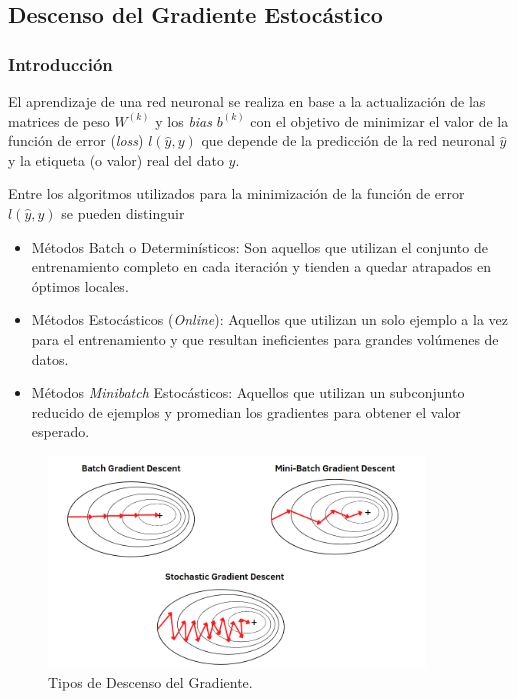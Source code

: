 \subsection{Descenso del Gradiente Estocástico} 

\subsubsection{Introducción }

El aprendizaje de una red neuronal se realiza en base a la actualización de las matrices de peso $W^{(k)}$ y los \textit{bias} $b^{(k)}$ con el objetivo de minimizar el valor de la función de error (\textit{loss}) $l(\hat{y},y)$ que depende de la predicción de la red neuronal $\hat{y}$ y la etiqueta (o valor) real del dato $y$. 

\vspace{0.2cm}

Entre los algoritmos utilizados para la minimización de la función de error $l(\hat{y},y)$ se pueden distinguir 
\begin{itemize}
    \item Métodos Batch o Determinísticos: Son aquellos que utilizan el conjunto de entrenamiento completo en cada iteración y tienden a quedar atrapados en óptimos locales. 
    
    \item Métodos Estocásticos (\textit{Online}): Aquellos que utilizan un solo ejemplo a la vez para el entrenamiento y que resultan ineficientes para grandes volúmenes de datos. 
    
    \item Métodos \textit{Minibatch} Estocásticos: Aquellos que utilizan un subconjunto reducido de ejemplos y promedian los gradientes para obtener el valor esperado.
    
\end{itemize}

\begin{figure}[h]
    \centering
    \includegraphics[width=10cm]{img/tesis/SGD.png}
    \caption{Tipos de Descenso del Gradiente.}
    \label{fig:SGD}
\end{figure}


